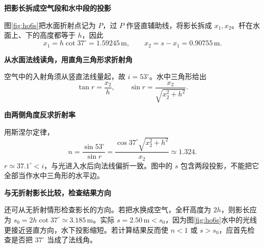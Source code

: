 \begin{solution}\textbf{把影长拆成空气段和水中段的投影}\par\nobreak
图\ref{fig:ho6s}把水面折射点记为 $P$，过 $P$ 作竖直辅助线，将影长拆成 $x_1,x_2$。杆在水面上、下的高度都等于 $h$，因此
\[
x_1=h\cot37^\circ=1.59245\,\mathrm m,
\qquad x_2=s-x_1=0.90755\,\mathrm m.
\]


\par\medskip{}\noindent\textbf{从水面法线读角，用直角三角形求折射角}\par\nobreak
空气中的入射角须从竖直法线量起，故 $i=53^\circ$。水中三角形给出
\[
\tan r=\frac{x_2}{h},\qquad
\sin r=\frac{x_2}{\sqrt{x_2^2+h^2}}.
\]



\par\medskip{}\noindent\textbf{由两侧角度反求折射率}\par\nobreak
用斯涅尔定律，
\[
\boxed{n=\frac{\sin53^\circ}{\sin r}
=\frac{\cos37^\circ\sqrt{x_2^2+h^2}}{x_2}
\simeq1.324.}
\]
$r\simeq37.1^\circ<i$，与光进入水后向法线偏折一致。图中的 $s$ 包含两段投影，不能把它全部当作水中三角形的水平边。



\par\medskip{}\noindent\textbf{与无折射影长比较，检查结果方向}\par\nobreak
还可从无折射情形检查影长的方向。若把水换成空气，全杆高度为 $2h$，则影长应为 $s_0=2h\cot37^\circ\simeq3.185\,\mathrm m$。实际 $s=2.50\,\mathrm m<s_0$，因为图\ref{fig:ho6s}水中的光线更接近竖直方向，水下投影缩短。若计算结果反而使 $n<1$ 或 $s>s_0$，应首先检查是否把 $37^\circ$ 当成了法线角。
\end{solution}

